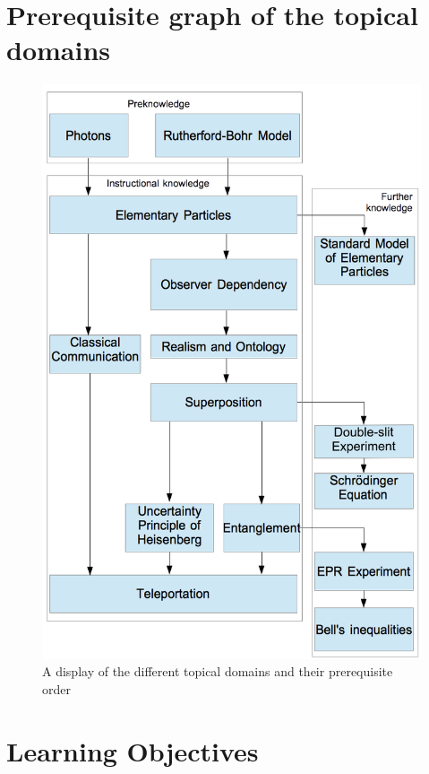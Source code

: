 \documentclass[11pt,twoside]{report} %
\begin{document}
\newpage

\chapter{Prerequisite graph of the topical domains}

\begin{figure}[h!]
\centering
\includegraphics[height=0.75\textheight]{knowledgediagram}
\caption{A display of the different topical domains and their prerequisite order}
\label{fig:knowledgediagram}
\end{figure}

\newpage

\chapter{Learning Objectives}
\label{app:learningobjectives}
\end{document}
